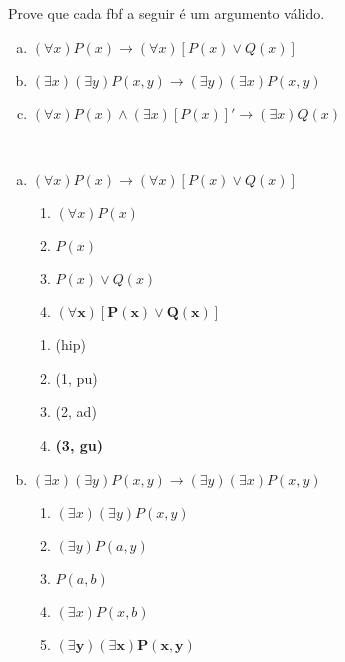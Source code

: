 \documentclass[a4paper, 12pt, addpoints]{exam}
\begin{document}
\begin{questions}
  \question Prove que cada fbf a seguir é um argumento válido.

  \begin{enumerate}[a.]
    \item $(\forall x)P(x) \rightarrow (\forall x)[P(x) \lor Q(x)]$
    \item $(\exists x)(\exists y)P(x, y) \rightarrow (\exists y)(\exists x)P(x, y)$
    \item $(\forall x)P(x) \land (\exists x)[P(x)]' \rightarrow (\exists x)Q(x)$
  \end{enumerate}

  \begin{resp}~

    \begin{enumerate}[a)]
      \item $(\forall x)P(x) \rightarrow (\forall x)[P(x) \lor Q(x)]$
            \begin{multicols}{2}

              \begin{enumerate}[1.]
                \item $(\forall x)P(x)$
                \item $P(x)$
                \item $P(x) \lor Q(x)$
                \item $\boldsymbol{(\forall x)[P(x) \lor Q(x)]}$
              \end{enumerate}

              \columnbreak

              \begin{enumerate}[\ding{32}]
                \item (hip)
                \item (1, pu)
                \item (2, ad)
                \item \textbf{(3, gu)}
              \end{enumerate}

            \end{multicols}

      \item $(\exists x)(\exists y)P(x, y) \rightarrow (\exists y)(\exists x)P(x, y)$
            \begin{multicols}{2}

              \begin{enumerate}[1.]
                \item $(\exists x)(\exists y)P(x, y)$
                \item $(\exists y)P(a,y)$
                \item $P(a,b)$
                \item $(\exists x)P(x,b)$
                \item $\boldsymbol{(\exists y)(\exists x)P(x, y)}$
              \end{enumerate}


\end{multicols}
\end{enumerate}
\end{resp}
\end{questions}
\end{document}

